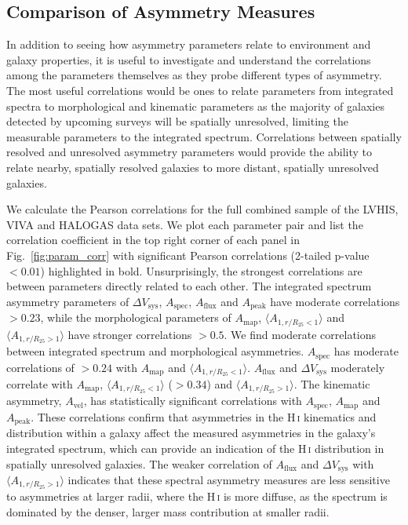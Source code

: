 \documentclass[fleqn,usenatbib]{mnras}
\begin{document}
\subsection{Comparison of Asymmetry Measures}
\label{s-sec:asym_comp}

In addition to seeing how asymmetry parameters relate to environment and galaxy properties, it is useful to investigate and understand the correlations among the parameters themselves as they probe different types of asymmetry. The most useful correlations would be ones to relate parameters from integrated spectra to morphological and kinematic parameters as the majority of galaxies detected by upcoming surveys will be spatially unresolved, limiting the measurable parameters to the integrated spectrum. Correlations between spatially resolved and unresolved asymmetry parameters would provide the ability to relate nearby, spatially resolved galaxies to more distant, spatially unresolved galaxies. 

We calculate the Pearson correlations for the full combined sample of the LVHIS, VIVA and HALOGAS data sets. We plot each parameter pair and list the correlation coefficient in the top right corner of each panel in Fig.~\ref{fig:param_corr} with significant Pearson correlations (2-tailed p-value $<0.01$) highlighted in bold. Unsurprisingly, the strongest correlations are between parameters directly related to each other. The integrated spectrum asymmetry parameters of $\Delta V_{\mathrm{sys}}$, $A_{\mathrm{spec}}$, $A_{\mathrm{flux}}$ and $A_{\mathrm{peak}}$ have moderate correlations $>0.23$, while the morphological parameters of $A_{\mathrm{map}}$, $\langle A_{1,r/R_{25}<1} \rangle$ and $\langle A_{1,r/R_{25}>1} \rangle$ have stronger correlations $>0.5$. We find moderate correlations between integrated spectrum and morphological asymmetries. $A_{\mathrm{spec}}$ has moderate correlations of $>0.24$ with $A_{\mathrm{map}}$ and $\langle A_{1,r/R_{25}<1} \rangle$. $A_{\mathrm{flux}}$ and $\Delta V_{\mathrm{sys}}$ moderately correlate with $A_{\mathrm{map}}$, $\langle A_{1,r/R_{25}<1} \rangle$ ($>0.34$) and $\langle A_{1,r/R_{25}>1} \rangle$. The kinematic asymmetry, $A_{\mathrm{vel}}$, has statistically significant correlations with $A_{\mathrm{spec}}$, $A_{\mathrm{map}}$ and $A_{\mathrm{peak}}$. These correlations confirm that asymmetries in the H\,\textsc{i} kinematics and distribution within a galaxy affect the measured asymmetries in the galaxy's integrated spectrum, which can provide an indication of the H\,\textsc{i} distribution in spatially unresolved galaxies. The weaker correlation of $A_{\mathrm{flux}}$ and $\Delta V_{\mathrm{sys}}$ with $\langle A_{1,r/R_{25}>1} \rangle$ indicates that these spectral asymmetry measures are less sensitive to asymmetries at larger radii, where the H\,\textsc{i} is more diffuse, as the spectrum is dominated by the denser, larger mass contribution at smaller radii.
\end{document}
